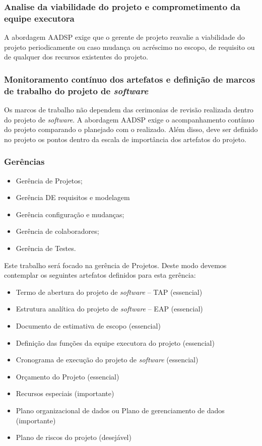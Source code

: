 \documentclass{acm_proc_article-sp}
\begin{document}
\subsubsection*{Analise da viabilidade do projeto e comprometimento da equipe executora}
A abordagem AADSP exige que o gerente de projeto reavalie a viabilidade do projeto periodicamente ou caso mudança ou acréscimo no escopo, de requisito ou de qualquer dos recursos existentes do projeto\cite{aadsp:hibirdo}.

\subsubsection*{Monitoramento contínuo dos artefatos e definição de marcos de trabalho do projeto de \textit{software}}
Os marcos de trabalho não dependem das cerimonias de revisão realizada dentro do projeto de \textit{software}.  A abordagem AADSP exige o acompanhamento contínuo do projeto comparando o planejado com o realizado. Além disso, deve ser definido no projeto os pontos dentro da escala de importância dos artefatos do projeto. 

\subsubsection*{Gerências}

\begin{itemize}
\item Gerência de Projetos;
\item Gerência DE requisitos e modelagem
\item Gerência configuração e mudanças;
\item Gerência de colaboradores;
\item Gerência de Testes.
\end{itemize}

Este trabalho será focado na gerência de Projetos. Deste modo devemos contemplar os seguintes artefatos definidos para esta gerência:

\begin{itemize}
\item Termo de abertura do  projeto de \textit{software} – TAP (essencial)
\item Estrutura analítica do projeto de \textit{software} – EAP (essencial)
\item Documento de estimativa de escopo (essencial)
\item Definição das funções da equipe executora do projeto (essencial)
\item Cronograma de execução do projeto de \textit{software} (essencial)
\item Orçamento do Projeto (essencial)
\item Recursos especiais (importante)
\item Plano organizacional de dados ou Plano de gerenciamento de dados  (importante)
\item Plano de riscos do projeto (desejável)
\end{itemize}
\end{document}
